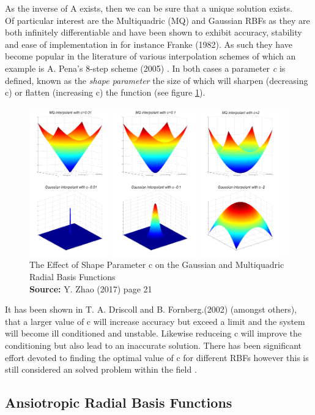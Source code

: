 \documentclass[a4paper]{amsart}
\newcommand*{\captionsource}[2]{%
  \caption[{#1}]{%
    #1%
    \\\hspace{\linewidth}%
    \textbf{Source:} #2%
  }%
}
\begin{document}
As the inverse of A exists, then we can be sure that a unique solution exists.\\

Of particular interest are the Multiquadric (MQ) and Gaussian RBFs as they are both infinitely differentiable and have been shown to exhibit accuracy, stability and ease of implementation in for instance Franke (1982)\cite{rbf3}. As such they have become popular in the literature of various interpolation schemes of which an example is A. Pena's 8-step scheme (2005) \cite{rbf6}. In both cases a parameter \emph{c} is defined, known as the \emph{shape parameter} the size of which will sharpen (decreasing c) or flatten (increasing c) the function (see figure \ref{fig:shape}).\\

\begin{figure}[h]
\centering
\includegraphics[scale=0.5]{RBFShapeParameters.png}
\captionsource{The Effect of Shape Parameter c on the Gaussian and Multiquadric Radial Basis Functions}{ Y. Zhao (2017) \cite{mski0} page 21}
\label {fig:shape}
\end{figure}

It has been shown in T. A. Driscoll and B. Fornberg.(2002) \cite{rbf4} (amongst others), that a larger value of c will increase accuracy but exceed a limit and the system will become ill conditioned and unstable. Likewise reduceing c will improve the conditioning but also lead to an inaccurate solution. There has been significant effort devoted to finding the optimal value of c for different RBFs however this is still considered an solved problem within the field \cite{mski0}.

\subsection {Ansiotropic Radial Basis Functions}
\end{document}
